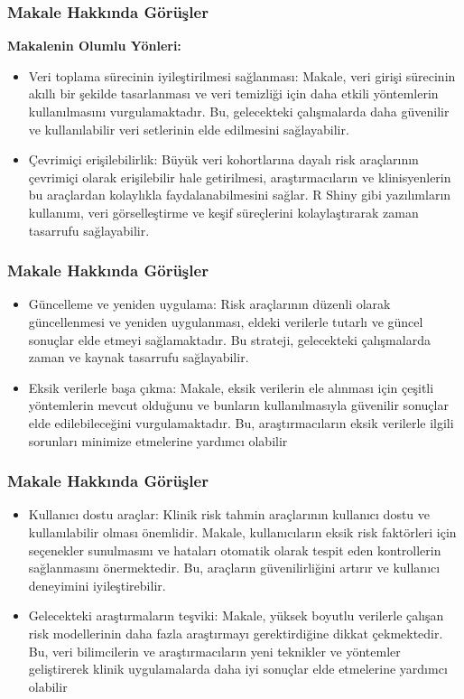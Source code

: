 \documentclass{beamer}
\begin{document}
\begin{frame}
\frametitle{Makale Hakkında Görüşler}
\textbf{Makalenin Olumlu Yönleri:} 
\begin{itemize}
\item Veri toplama sürecinin iyileştirilmesi sağlanması: Makale, veri girişi sürecinin akıllı bir şekilde tasarlanması ve veri temizliği için daha etkili yöntemlerin kullanılmasını vurgulamaktadır. Bu, gelecekteki çalışmalarda daha güvenilir ve kullanılabilir veri setlerinin elde edilmesini sağlayabilir.
\item Çevrimiçi erişilebilirlik: Büyük veri kohortlarına dayalı risk araçlarının çevrimiçi olarak erişilebilir hale getirilmesi, araştırmacıların ve klinisyenlerin bu araçlardan kolaylıkla faydalanabilmesini sağlar. R Shiny gibi yazılımların kullanımı, veri görselleştirme ve keşif süreçlerini kolaylaştırarak zaman tasarrufu sağlayabilir.
\end{itemize}

\end{frame}

\begin{frame}
\frametitle{Makale Hakkında Görüşler}
\begin{itemize}
\item Güncelleme ve yeniden uygulama: Risk araçlarının düzenli olarak güncellenmesi ve yeniden uygulanması, eldeki verilerle tutarlı ve güncel sonuçlar elde etmeyi sağlamaktadır. Bu strateji, gelecekteki çalışmalarda zaman ve kaynak tasarrufu sağlayabilir.
\item Eksik verilerle başa çıkma: Makale, eksik verilerin ele alınması için çeşitli yöntemlerin mevcut olduğunu ve bunların kullanılmasıyla güvenilir sonuçlar elde edilebileceğini vurgulamaktadır. Bu, araştırmacıların eksik verilerle ilgili sorunları minimize etmelerine yardımcı olabilir
\end{itemize}

\end{frame}

\begin{frame}
\frametitle{Makale Hakkında Görüşler}
\begin{itemize}
\item Kullanıcı dostu araçlar: Klinik risk tahmin araçlarının kullanıcı dostu ve kullanılabilir olması önemlidir. Makale, kullanıcıların eksik risk faktörleri için seçenekler sunulmasını ve hataları otomatik olarak tespit eden kontrollerin sağlanmasını önermektedir. Bu, araçların güvenilirliğini artırır ve kullanıcı deneyimini iyileştirebilir.
\item Gelecekteki araştırmaların teşviki: Makale, yüksek boyutlu verilerle çalışan risk modellerinin daha fazla araştırmayı gerektirdiğine dikkat çekmektedir. Bu, veri bilimcilerin ve araştırmacıların yeni teknikler ve yöntemler geliştirerek klinik uygulamalarda daha iyi sonuçlar elde etmelerine yardımcı olabilir
\end{itemize}

\end{frame}
\end{document}
